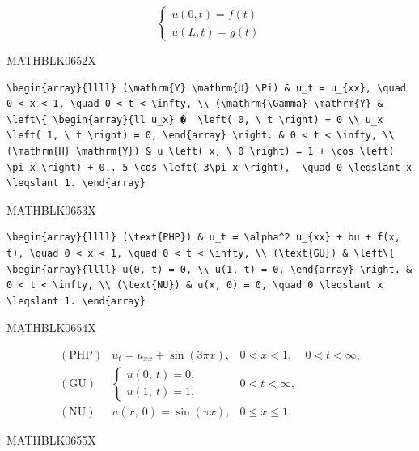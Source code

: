 \documentclass[
  ukrainian,
]{article}
\begin{document}
\[
\begin{cases} u(0, t) = f(t) \\ u(L, t) = g(t) \end{cases}
\]

MATHBLK0652X

\begin{verbatim}
\begin{array}{llll} (\mathrm{Y} \mathrm{U} \Pi) & u_t = u_{xx}, \quad 0 < x < 1, \quad 0 < t < \infty, \\ (\mathrm{\Gamma} \mathrm{Y} & \left\{ \begin{array}{ll u_x} �  \left( 0, \ t \right) = 0 \\ u_x \left( 1, \ t \right) = 0, \end{array} \right. & 0 < t < \infty, \\ (\mathrm{H} \mathrm{Y}) & u \left( x, \ 0 \right) = 1 + \cos \left( \pi x \right) + 0.. 5 \cos \left( 3\pi x \right),  \quad 0 \leqslant x \leqslant 1. \end{array}
\end{verbatim}

MATHBLK0653X

\begin{verbatim}
\begin{array}{llll} (\text{PHP}) & u_t = \alpha^2 u_{xx} + bu + f(x, t), \quad 0 < x < 1, \quad 0 < t < \infty, \\ (\text{GU}) & \left\{ \begin{array}{llll} u(0, t) = 0, \\ u(1, t) = 0, \end{array} \right. & 0 < t < \infty, \\ (\text{NU}) & u(x, 0) = 0, \quad 0 \leqslant x \leqslant 1. \end{array}
\end{verbatim}

MATHBLK0654X

\[
\begin{array}{llll} (\text{PHP}) & u_t = u_{xx} + \sin{(3\pi x)}, & 0 < x < 1, & 0 < t < \infty, \\ (\text{GU}) & \begin{cases} u(0, \ t) = 0, \\ u(1, \ t) = 1, \end{cases} & 0 < t < \infty, \\ (\text{NU}) & u(x, \ 0) = \sin{(\pi x)}, & 0 \leqslant x \leqslant 1. \end{array}
\]

MATHBLK0655X
\end{document}
